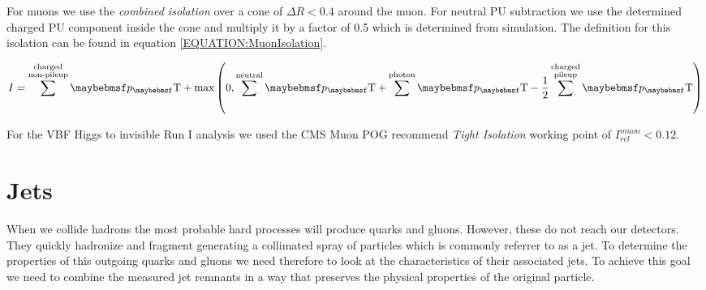 

For muons we use the \textit{combined isolation} over a cone of $\Delta R < 0.4$ around the muon. For neutral \gls{PU} subtraction we use the determined charged \gls{PU} component inside the cone and multiply it by a factor of 0.5 which is determined from simulation. The definition for this isolation can be found in equation \ref{EQUATION:MuonIsolation}.

\begin{equation}
I = \sum^{\substack{\text{charged} \\ \text{non-pileup}}}\pT +
\text{max}\left(0,\sum^{\text{neutral}}\pT+\sum^{\text{photon}}\pT-\frac{1}{2}\sum^{\substack{\text{charged}
\\ \text{pileup}}}\pT\right)
\label{EQUATION:MuonIsolation}
\end{equation}

For the \gls{VBF} Higgs to invisible Run I analysis we used the \gls{CMS} Muon \gls{POG} recommend \textit{Tight Isolation} working point of $I_{rel}^{muon}<0.12$.


\section{Jets}
\label{SECTION:EventReconstructionPhysicsObjects_Jets}


When we collide hadrons the most probable hard processes will produce quarks and gluons. However, these do not reach our detectors. They quickly hadronize and fragment generating a collimated spray of particles which is commonly referrer to as a jet. To determine the properties of this outgoing quarks and gluons we need therefore to look at the characteristics of their associated jets. To achieve this goal we need to combine the measured jet remnants in a way that preserves the physical properties of the original particle.


